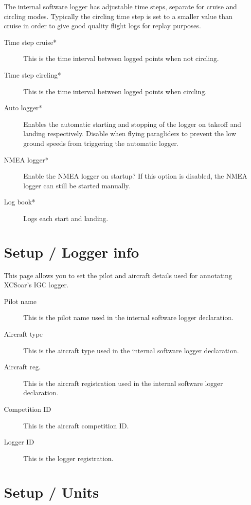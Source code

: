 The internal software logger has adjustable time steps, separate for
cruise and circling modes.  
Typically the circling time step is set to a smaller value
than cruise in order to give good quality flight logs for replay
purposes.

\begin{description}
\item[Time step cruise*]  This is the time interval between logged points when 
  not circling. 
\item[Time step circling*]  This is the time interval between logged points when 
  circling. 
\item[Auto logger*]  Enables the automatic starting and stopping of the logger
  on takeoff and landing respectively. Disable when flying paragliders to prevent 
  the low ground speeds from triggering the automatic logger.
\item[NMEA logger*]  Enable the NMEA logger on startup? If this option is disabled, 
  the NMEA logger can still be started manually.
\item[Log book*]  Logs each start and landing.
\end{description}


\section{Setup / Logger info} \label{conf:logger_info}

This page allows you to set the pilot and aircraft details used for
annotating XCSoar's IGC logger.  

\begin{description}
\item[Pilot name]  This is the pilot name used in the internal software logger 
  declaration.
\item[Aircraft type]  This is the aircraft type used in the internal software 
  logger declaration.
\item[Aircraft reg.]  This is the aircraft registration used in the internal 
  software logger declaration.
\item[Competition ID]  This is the aircraft competition ID.
\item[Logger ID]  This is the logger registration.
\end{description}


\section{Setup / Units}

